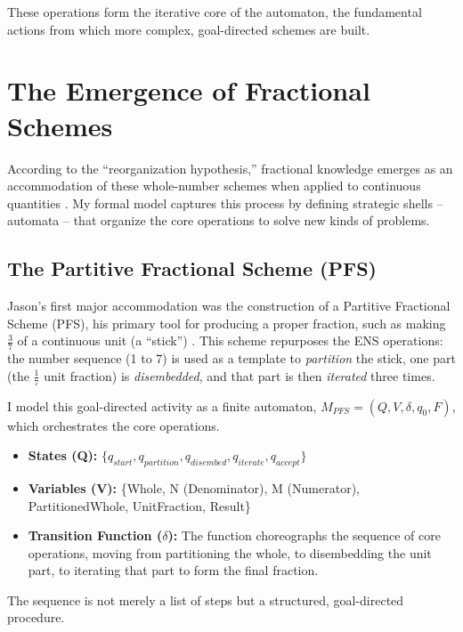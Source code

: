 \documentclass[12pt]{book}
\begin{document}
These operations form the iterative core of the automaton, the fundamental actions from which more complex, goal-directed schemes are built.

\section{The Emergence of Fractional Schemes}

According to the ``reorganization hypothesis,'' fractional knowledge emerges as an accommodation of these whole-number schemes when applied to continuous quantities \parencite {steffe2002new}. My formal model captures this process by defining strategic shells  -- automata  -- that organize the core operations to solve new kinds of problems.

\subsection{The Partitive Fractional Scheme (PFS)}

Jason's first major accommodation was the construction of a Partitive Fractional Scheme (PFS), his primary tool for producing a proper fraction, such as making $\frac{3}{7}$ of a continuous unit (a ``stick'') \parencite {steffe2003construction}. This scheme repurposes the ENS operations: the number sequence (1 to 7) is used as a template to \textit{partition} the stick, one part (the $\frac{1}{7}$ unit fraction) is \textit{disembedded}, and that part is then \textit{iterated} three times.

I model this goal-directed activity as a finite automaton, $M_{PFS} = (Q, V, \delta, q_0, F)$, which orchestrates the core operations.

\begin{itemize}
    \item \textbf{States (Q):} $\{q_{start}, q_{partition}, q_{disembed}, q_{iterate}, q_{accept}\}$
    \item \textbf{Variables (V):} \{Whole, N (Denominator), M (Numerator), PartitionedWhole, UnitFraction, Result\}
    \item \textbf{Transition Function ($\delta$):} The function choreographs the sequence of core operations, moving from partitioning the whole, to disembedding the unit part, to iterating that part to form the final fraction.
\end{itemize}

The sequence is not merely a list of steps but a structured, goal-directed procedure.
\end{document}

